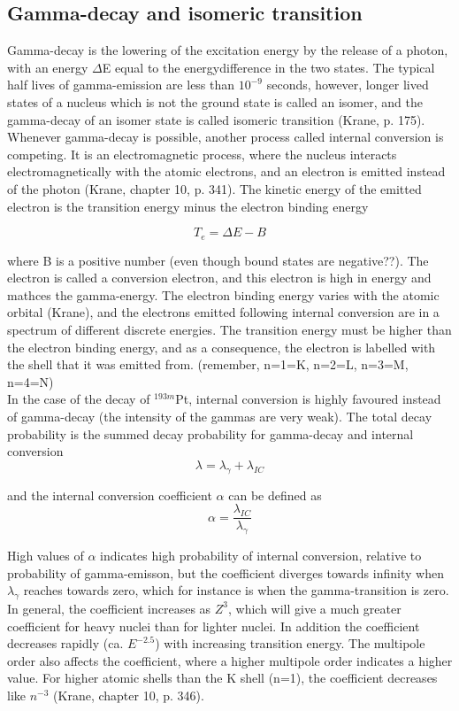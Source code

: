 \documentclass[a4paper,11pt,twoside]{book}
\begin{document}
\subsection{Gamma-decay and isomeric transition}
Gamma-decay is the lowering of the excitation energy by the release of a photon, with an energy $\Delta$E equal to the energydifference in the two states. The typical half lives of gamma-emission are less than $10^{-9}$ seconds, however, longer lived states of a nucleus which is not the ground state is called an isomer, and the gamma-decay of an isomer state is called isomeric transition (Krane, p. 175). Whenever gamma-decay is possible, another process called internal conversion is competing. It is an electromagnetic process, where the nucleus interacts electromagnetically with the atomic electrons, and an electron is emitted instead of the photon (Krane, chapter 10, p. 341). The kinetic energy of the emitted electron is the transition energy minus the electron binding energy

\begin{equation}
    T_e = \Delta E - B
\end{equation}

where B is a positive number (even though bound states are negative??). The electron is called a conversion electron, and this electron is high in energy and mathces the gamma-energy. 
The electron binding energy varies with the atomic orbital (Krane), and the electrons emitted following internal conversion are in a spectrum of different discrete energies. The transition energy must be higher than the electron binding energy, and as a consequence, the electron is labelled with the shell that it was emitted from. (remember, n=1=K, n=2=L, n=3=M, n=4=N) \\ 

In the case of the decay of $^{193m}$Pt, internal conversion is highly favoured instead of gamma-decay (the intensity of the gammas are very weak). The total decay probability is the summed decay probability for gamma-decay and internal conversion
\begin{equation}
\lambda = \lambda_\gamma + \lambda_{IC}    
\end{equation}

and the internal conversion coefficient $\alpha$ can be defined as
\begin{equation}
    \alpha = \frac{\lambda_{IC}}{\lambda_\gamma}
\end{equation}

High values of $\alpha$ indicates high probability of internal conversion, relative to probability of gamma-emisson, but the coefficient diverges towards infinity when $\lambda_\gamma$ reaches towards zero, which for instance is when the gamma-transition is zero. In general, the coefficient increases as $Z^3$, which will give a much greater coefficient for heavy nuclei than for lighter nuclei. In addition the coefficient decreases rapidly (ca. $E^{-2.5}$) with increasing transition energy. The multipole order also affects the coefficient, where a higher multipole order indicates a higher value. For higher atomic shells than the K shell (n=1), the coefficient decreases like $n^{-3}$ (Krane, chapter 10, p. 346). \\
\end{document}
